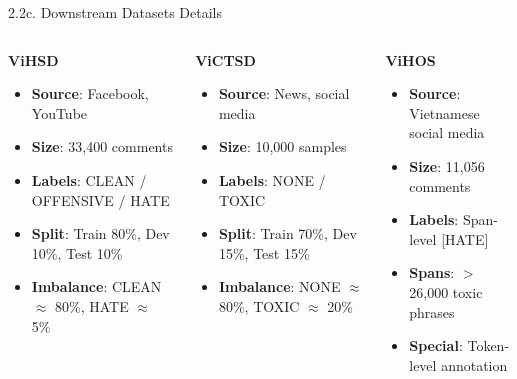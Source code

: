 \documentclass[11pt, aspectratio=169]{beamer}
\begin{document}
\begin{frame}[fragile, shrink=10]{2.2c. Downstream Datasets Details}

\begin{columns}[T]
  \begin{block}{\textbf{ViHSD}}
    \scriptsize
    \begin{itemize}
      \item \textbf{Source}: Facebook, YouTube
      \item \textbf{Size}: 33,400 comments
      \item \textbf{Labels}: CLEAN / OFFENSIVE / HATE
      \item \textbf{Split}: Train 80\%, Dev 10\%, Test 10\%
      \item \textbf{Imbalance}: CLEAN $\approx$ 80\%, HATE $\approx$ 5\%
    \end{itemize}
  \end{block}

  \begin{block}{\textbf{ViCTSD}}
    \scriptsize
    \begin{itemize}
      \item \textbf{Source}: News, social media
      \item \textbf{Size}: 10,000 samples
      \item \textbf{Labels}: NONE / TOXIC
      \item \textbf{Split}: Train 70\%, Dev 15\%, Test 15\%
      \item \textbf{Imbalance}: NONE $\approx$ 80\%, TOXIC $\approx$ 20\%
    \end{itemize}
  \end{block}

  \begin{block}{\textbf{ViHOS}}
    \scriptsize
    \begin{itemize}
      \item \textbf{Source}: Vietnamese social media
      \item \textbf{Size}: 11,056 comments
      \item \textbf{Labels}: Span-level [HATE]
      \item \textbf{Spans}: $>$26,000 toxic phrases
      \item \textbf{Special}: Token-level annotation
    \end{itemize}
  \end{block}
\end{columns}


\end{frame}
\end{document}

